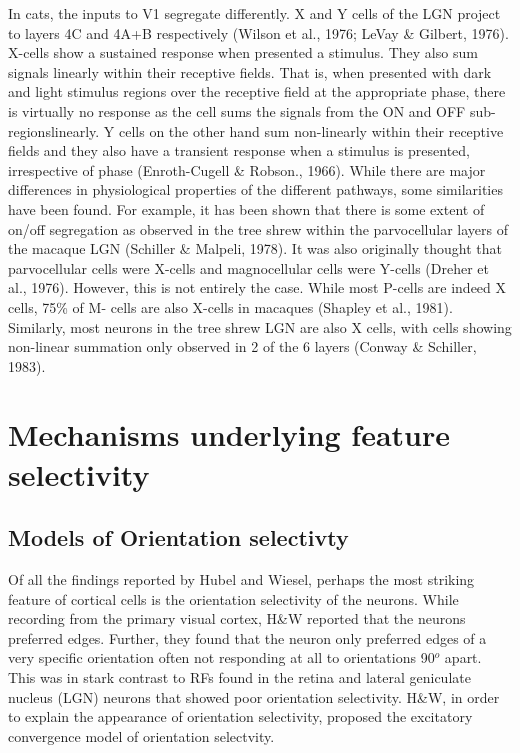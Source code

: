 In cats, the inputs to V1 segregate differently. X and Y cells of the LGN project to layers 4C and 4A+B respectively (Wilson et al., 1976; LeVay \& Gilbert, 1976). X-cells show a sustained response when presented a stimulus. They also sum signals linearly within their receptive fields. That is, when presented with dark and light stimulus regions over the receptive field at the appropriate phase, there is virtually no response as the cell sums the signals from the ON and OFF sub-regionslinearly. Y cells on the other hand sum non-linearly within their receptive fields and they also have a transient response when a stimulus is presented, irrespective of phase (Enroth-Cugell \& Robson., 1966).
While there are major differences in physiological properties of the different pathways, some similarities have been found. For example, it has been shown that there is some extent of on/off segregation as observed in the tree shrew within the parvocellular layers of the macaque LGN (Schiller \& Malpeli, 1978). It was also originally thought that parvocellular cells were X-cells and magnocellular cells were Y-cells (Dreher et al., 1976). However, this is not entirely the case. While most P-cells are indeed X cells, 75\% of M- cells are also X-cells in macaques (Shapley et al., 1981). Similarly, most neurons in the tree shrew LGN are also X cells, with cells showing non-linear summation only observed in 2 of the 6 layers (Conway \& Schiller, 1983).


\section{Mechanisms underlying feature selectivity}

\subsection{Models of Orientation selectivty}


Of all the findings reported by Hubel and Wiesel, perhaps the most striking feature of cortical cells is the orientation selectivity of the neurons. While recording from the primary visual cortex, H\&W reported that the neurons preferred edges. Further, they found that the neuron only preferred edges of a very specific orientation often not responding at all to orientations 90$^o$ apart. This was in stark contrast to RFs found in the retina and lateral geniculate nucleus (LGN) neurons that showed poor orientation selectivity. H\&W, in order to explain the appearance of orientation selectivity, proposed the excitatory convergence model of orientation selectvity.

